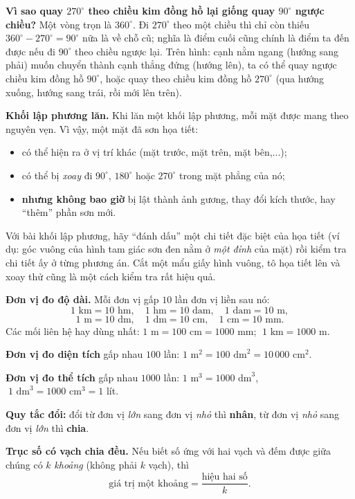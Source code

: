 \begin{proofbox}
\textbf{Vì sao quay $270^\circ$ theo chiều kim đồng hồ lại giống quay $90^\circ$ ngược chiều?} Một vòng trọn là $360^\circ$. Đi $270^\circ$ theo một chiều thì chỉ còn thiếu $360^\circ-270^\circ=90^\circ$ nữa là về chỗ cũ; nghĩa là điểm cuối cũng chính là điểm ta đến được nếu đi $90^\circ$ theo chiều ngược lại. Trên hình: cạnh nằm ngang (hướng sang phải) muốn chuyển thành cạnh thẳng đứng (hướng lên), ta có thể quay ngược chiều kim đồng hồ $90^\circ$, hoặc quay theo chiều kim đồng hồ $270^\circ$ (qua hướng xuống, hướng sang trái, rồi mới lên trên).
\end{proofbox}

\begin{knowbox}
\textbf{Khối lập phương lăn.} Khi lăn một khối lập phương, mỗi mặt được mang theo nguyên vẹn. Vì vậy, một mặt đã sơn họa tiết:
\begin{itemize}[leftmargin=1.3em,itemsep=1pt,topsep=2pt]
  \item có thể hiện ra ở vị trí khác (mặt trước, mặt trên, mặt bên,...);
  \item có thể bị \emph{xoay} đi $90^\circ$, $180^\circ$ hoặc $270^\circ$ trong mặt phẳng của nó;
  \item \textbf{nhưng không bao giờ} bị lật thành ảnh gương, thay đổi kích thước, hay ``thêm'' phần sơn mới.
\end{itemize}
\end{knowbox}

\begin{tipbox}
Với bài khối lập phương, hãy ``đánh dấu'' một chi tiết đặc biệt của họa tiết (ví dụ: góc vuông của hình tam giác sơn đen nằm ở \emph{một đỉnh} của mặt) rồi kiểm tra chi tiết ấy ở từng phương án. Cắt một mẩu giấy hình vuông, tô họa tiết lên và xoay thử cũng là một cách kiểm tra rất hiệu quả.
\end{tipbox}

\begin{knowbox}
\textbf{Đơn vị đo độ dài.} Mỗi đơn vị gấp $10$ lần đơn vị liền sau nó:
\[ 1\text{ km}=10\text{ hm},\quad 1\text{ hm}=10\text{ dam},\quad 1\text{ dam}=10\text{ m}, \]
\[ 1\text{ m}=10\text{ dm},\quad 1\text{ dm}=10\text{ cm},\quad 1\text{ cm}=10\text{ mm}. \]
Các mối liên hệ hay dùng nhất: $1\text{ m}=100\text{ cm}=1000\text{ mm}$; $\;1\text{ km}=1000\text{ m}$.

\textbf{Đơn vị đo diện tích} gấp nhau $100$ lần: $1\text{ m}^2=100\text{ dm}^2=10\,000\text{ cm}^2$.

\textbf{Đơn vị đo thể tích} gấp nhau $1000$ lần: $1\text{ m}^3=1000\text{ dm}^3$, $\;1\text{ dm}^3=1000\text{ cm}^3=1$ lít.

\textbf{Quy tắc đổi:} đổi từ đơn vị \emph{lớn} sang đơn vị \emph{nhỏ} thì \textbf{nhân}, từ đơn vị \emph{nhỏ} sang đơn vị \emph{lớn} thì \textbf{chia}.

\textbf{Trục số có vạch chia đều.} Nếu biết số ứng với hai vạch và đếm được giữa chúng có $k$ \emph{khoảng} (không phải $k$ vạch), thì
\[ \text{giá trị một khoảng}=\frac{\text{hiệu hai số}}{k}. \]
\end{knowbox}

